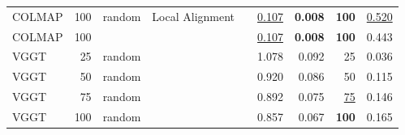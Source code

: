 \begin{table}[H]
\begin{tabular}{lrlllrrrr}
COLMAP & 100 & random & Local Alignment &  & \underline{0.107} & \textbf{0.008} & \textbf{100} & \underline{0.520} \\
COLMAP & 100 &  &  &  & \underline{0.107} & \textbf{0.008} & \textbf{100} & 0.443 \\
VGGT & 25 & random &  &  & 1.078 & 0.092 & 25 & 0.036 \\
VGGT & 50 & random &  &  & 0.920 & 0.086 & 50 & 0.115 \\
VGGT & 75 & random &  &  & 0.892 & 0.075 & \underline{75} & 0.146 \\
VGGT & 100 & random &  &  & 0.857 & 0.067 & \textbf{100} & 0.165 \\
\bottomrule
\end{tabular}
\end{table}
